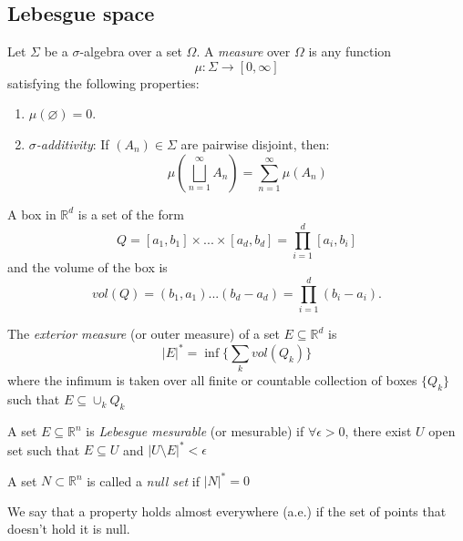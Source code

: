 \documentclass[../main.tex]{subfiles}
\begin{document}
\subsection{Lebesgue space}


\begin{definition}
	Let $\Sigma$ be a $\sigma$-algebra over a set $\Omega$. A \emph{measure} over $\Omega$ is any function $$\mu:\Sigma\longrightarrow[0,\infty]$$ satisfying the following properties:
	\begin{enumerate}
		\item $\mu(\varnothing)=0$.
		\item\label{RFA:sigmaadditivity} \emph{$\sigma$-additivity}: If $(A_n)\in\Sigma$ are pairwise disjoint, then: $$\mu\left(\bigsqcup_{n=1}^\infty A_n\right)=\sum_{n=1}^\infty \mu(A_n)$$
	\end{enumerate}
\end{definition}

\begin{definition} A box in $\mathbb{R}^d$ is a set of the form 
	$$ Q = [a_1,b_1]  \times ... \times [a_d,b_d] = \prod_{i=1}^d [a_i,b_i]$$
	and the volume of the box is $$ vol(Q)= (b_1,a_1) ... (b_d-a_d)= \prod_{i=1}^d (b_i-a_i).$$
	\end{definition}
\begin{definition}
	The \emph{exterior measure} (or outer measure) of a set $E\subseteq \mathbb{R}^d$ is $$ |E|^* = \inf\{\sum_k vol(Q_k)\} $$ 
	where the infimum is taken over all finite or countable collection of boxes $\{Q_k\}$ such that $E \subseteq \cup_k Q_k$
\end{definition}

\begin{definition}
A set $E\subseteq \mathbb{R}^n $ is \emph{Lebesgue mesurable} (or mesurable) if $\forall \epsilon >0$, there exist $U$ open set such that $E \subseteq U$ and $|U\setminus E|^* < \epsilon $
\end{definition}

\begin{definition}
A set $N \subset \mathbb{R}^n $ is called a \textit{null set }if $|N|^*=0$
\end{definition}

\begin{definition}
	We say that a property holds almost everywhere (a.e.) if the set of points that doesn’t hold it is null.
\end{definition}
\end{document}
